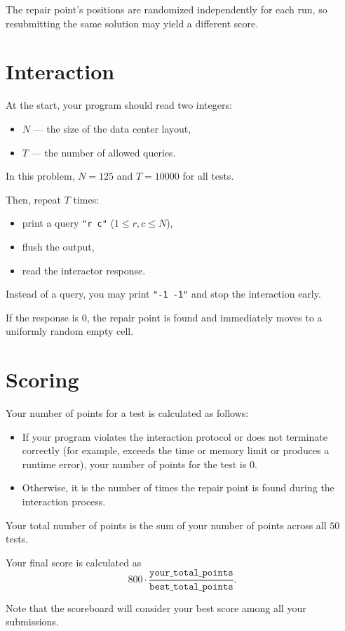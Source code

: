 \documentclass[11pt]{article}
\begin{document}
The repair point's positions are randomized independently for each run, so resubmitting the same solution may yield a different score.

\section*{Interaction}

At the start, your program should read two integers:
\begin{itemize}
    \item $N$ --- the size of the data center layout,
    \item $T$ --- the number of allowed queries.
\end{itemize}

In this problem, $N = 125$ and $T = 10000$ for all tests.

Then, repeat $T$ times:
\begin{itemize}
    \item print a query \texttt{"r c"} ($1 \le r,c \le N$),
    \item flush the output,
    \item read the interactor response.
\end{itemize}

Instead of a query, you may print \texttt{"-1 -1"} and stop the interaction early.

If the response is $0$, the repair point is found and immediately moves to a uniformly random empty cell.

\section*{Scoring}

Your number of points for a test is calculated as follows:
\begin{itemize}
    \item If your program violates the interaction protocol or does not terminate correctly (for example, exceeds the time or memory limit or produces a runtime error), your number of points for the test is $0$.
    \item Otherwise, it is the number of times the repair point is found during the interaction process.
\end{itemize}

Your total number of points is the sum of your number of points across all $50$ tests.

Your final score is calculated as
\[
800 \cdot \frac{\texttt{your\_total\_points}}{\texttt{best\_total\_points}}.
\]

Note that the scoreboard will consider your best score among all your submissions.
\end{document}
